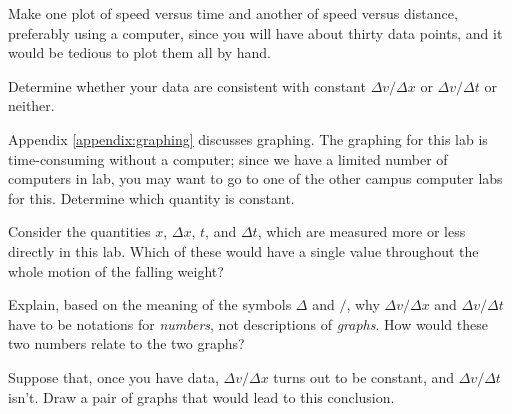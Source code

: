 Make one plot of speed versus time and another of speed
versus distance, preferably using a computer, since you will
have about thirty data points, and it would be tedious to
plot them all by hand.

Determine whether your data are consistent with constant
$\Delta v/\Delta x$ or $\Delta v/\Delta t$ or neither. 

\selfcheck

Appendix \ref{appendix:graphing} discusses graphing.
The graphing for this lab is time-consuming without a computer; since we
have a limited number of computers in lab, you may want to go to one of the other campus
computer labs for this. Determine which quantity is constant.

\prelab

\prelabquestion Consider the quantities $x$, $\Delta x$, $t$, and $\Delta t$, which are
measured more or less directly in this lab. Which of these would have a single value
throughout the whole motion of the falling weight?

\prelabquestion Explain, based on the meaning of the symbols $\Delta$ and $/$,
why $\Delta v/\Delta x$ and $\Delta v/\Delta t$ have to be notations for \emph{numbers},
not descriptions of \emph{graphs}. How would these two numbers relate to the two
graphs?

\prelabquestion
Suppose that, once you have data, $\Delta v/\Delta x$ turns out to be constant, and
$\Delta v/\Delta t$ isn't. Draw a pair of graphs that would lead to this conclusion.
